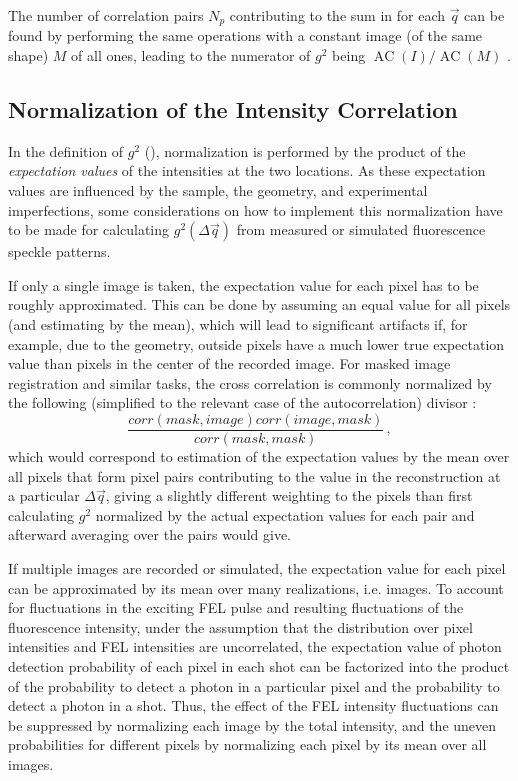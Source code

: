 The number of correlation pairs $N_p$ contributing to the sum in  for each $\vec{q}$ can be found by performing the same operations with a constant image (of the same shape) $M$ of all ones, leading to the numerator of $g^2$ being $\operatorname{AC}(I)/\operatorname{AC}(M)$ \cite{oppenheim2009,butz2015,nion2008}.

\subsection{Normalization of the Intensity Correlation}
\label{sec:normal}
In the definition of $g^2$ (), normalization is performed by the product of the \textit{expectation values} of the intensities at the two locations. As these expectation values are influenced by the sample, the geometry, and experimental imperfections, some considerations on how to implement this normalization have to be made for calculating $g^2(\Delta\vec{q})$ from measured or simulated fluorescence speckle patterns. 

If only a single image is taken, the expectation value for each pixel has to be roughly approximated. This can be done by assuming an equal value for all pixels (and estimating by the mean), which will lead to significant artifacts if, for example, due to the geometry, outside pixels have a much lower true expectation value than pixels in the center of the recorded image.  
For masked image registration and similar tasks, the cross correlation is commonly normalized by the following (simplified to the relevant case of the autocorrelation) divisor \cite{padfield2010}:
\begin{equation}
	\frac{\mathit{corr}(\mathit{mask},\mathit{image}) \mathit{corr}(\mathit{image},\mathit{mask})}{\mathit{corr}(\mathit{mask},\mathit{mask})} \,,
	\label{eq:normshot}
\end{equation} which would correspond to estimation of the expectation values by the mean over all pixels that form pixel pairs contributing to the value in the reconstruction at a particular $\Delta \vec{q}$, giving a slightly different weighting to the pixels than first calculating $g^2$ normalized by the actual expectation values for each pair and afterward averaging over the pairs would give.

If multiple images are recorded or simulated, the expectation value for each pixel can be approximated by its mean over many realizations, i.e. images. To account for fluctuations in the exciting FEL pulse and resulting fluctuations of the fluorescence intensity, under the assumption that the distribution over pixel intensities and FEL intensities are uncorrelated, the expectation value of photon detection probability of each pixel in each shot can be factorized into the product of the probability to detect a photon in a particular pixel and the probability to detect a photon in a shot. Thus, the effect of the FEL intensity fluctuations can be suppressed by normalizing each image by the total intensity, and the uneven probabilities for different pixels by normalizing each pixel by its mean over all images. 


